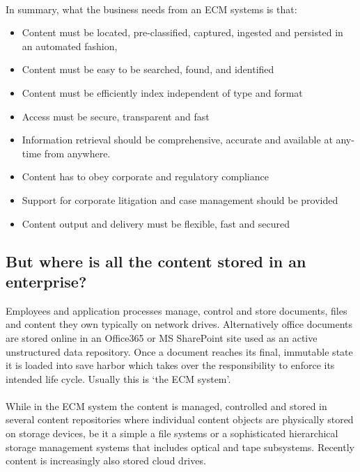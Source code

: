 \documentclass[EPiC]{easychair} %
\begin{document}
\paragraph{} In summary, what the business needs from an ECM systems is that:
\begin{itemize}
    \item Content must be located, pre-classified, captured, ingested and persisted in an automated fashion,
    \item Content must be easy to be searched, found, and identified
    \item Content must be efficiently index independent of type and format 
    \item Access must be secure, transparent and fast 
    \item Information 	retrieval should be comprehensive, accurate and available at any-time from anywhere.
    \item Content has to obey corporate and regulatory compliance
    \item Support for corporate litigation and case management should be provided 
    \item Content output and delivery must be flexible, fast and secured 
\end{itemize}

\subsection{But where is all the content stored in an enterprise?}

Employees and application processes manage, control and store documents, files and content they own typically on network drives. Alternatively office documents are
stored online in an Office365 or MS SharePoint site used as an active unstructured data repository. Once a document reaches its final, immutable state it is loaded into save harbor which takes over the responsibility to enforce its intended life cycle. Usually this is ‘the ECM system’. 

\paragraph{} While in the ECM system the content is managed, controlled and stored in several content repositories where individual content objects are physically stored on storage devices, be it a simple a file systems or a sophisticated hierarchical storage management systems that includes optical and tape subsystems. Recently content is increasingly also stored cloud drives. 
\end{document}
